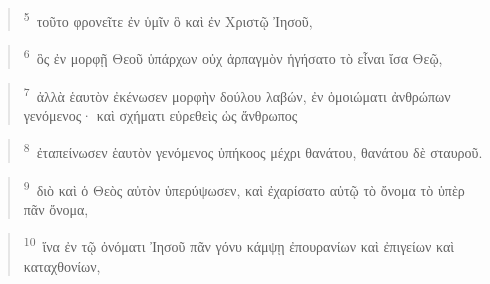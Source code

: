 \documentclass{article}
\newcommand{\currentverse}{1} %
\newcommand{\setcurrentverse}[1]{\renewcommand{\currentverse}{#1}}
\begin{document}
\begin{verse}

\setcurrentverse{5}

\setcounter{footnote}{0}

\textsuperscript{5}~τοῦτο φρονεῖτε ἐν ὑμῖν ὃ καὶ ἐν Χριστῷ Ἰησοῦ,

\end{verse}

\begin{verse}

\setcurrentverse{6}

\setcounter{footnote}{0}

\textsuperscript{6}~ὃς ἐν μορφῇ Θεοῦ ὑπάρχων οὐχ ἁρπαγμὸν ἡγήσατο τὸ εἶναι ἴσα Θεῷ,

\end{verse}

\begin{verse}

\setcurrentverse{7}

\setcounter{footnote}{0}

\textsuperscript{7}~ἀλλὰ ἑαυτὸν ἐκένωσεν μορφὴν δούλου λαβών, ἐν ὁμοιώματι ἀνθρώπων γενόμενος· καὶ σχήματι εὑρεθεὶς ὡς ἄνθρωπος

\end{verse}

\begin{verse}

\setcurrentverse{8}

\setcounter{footnote}{0}

\textsuperscript{8}~ἐταπείνωσεν ἑαυτὸν γενόμενος ὑπήκοος μέχρι θανάτου, θανάτου δὲ σταυροῦ.

\end{verse}

\begin{verse}

\setcurrentverse{9}

\setcounter{footnote}{0}

\textsuperscript{9}~διὸ καὶ ὁ Θεὸς αὐτὸν ὑπερύψωσεν, καὶ ἐχαρίσατο αὐτῷ τὸ ὄνομα τὸ ὑπὲρ πᾶν ὄνομα,

\end{verse}

\begin{verse}

\setcurrentverse{10}

\setcounter{footnote}{0}

\textsuperscript{10}~ἵνα ἐν τῷ ὀνόματι Ἰησοῦ πᾶν γόνυ κάμψῃ ἐπουρανίων καὶ ἐπιγείων καὶ καταχθονίων,

\end{verse}
\end{document}
